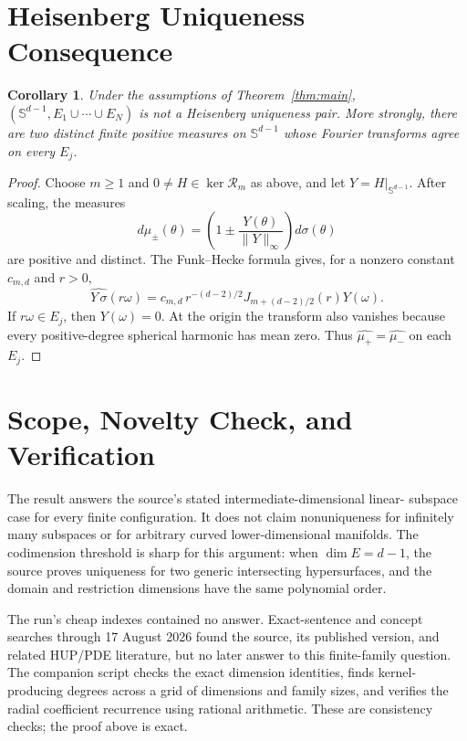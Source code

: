 \documentclass[11pt]{article}
\newtheorem{corollary}{Corollary}
\newcommand{\sphere}{\mathbb S}
\begin{document}
\section*{Heisenberg Uniqueness Consequence}

\begin{corollary}\label{cor:hup}
Under the assumptions of Theorem~\ref{thm:main},
$(\sphere^{d-1},E_1\cup\cdots\cup E_N)$ is not a Heisenberg uniqueness
pair.  More strongly, there are two distinct finite positive measures on
$\sphere^{d-1}$ whose Fourier transforms agree on every $E_j$.
\end{corollary}

\begin{proof}
Choose $m\geq1$ and $0\neq H\in\ker\mathcal R_m$ as above, and let
$Y=H|_{\sphere^{d-1}}$.  After scaling, the measures
\[
 d\mu_\pm(\theta)=
 \left(1\pm\frac{Y(\theta)}{\|Y\|_\infty}\right)d\sigma(\theta)
\]
are positive and distinct.  The Funk--Hecke formula gives, for a nonzero
constant $c_{m,d}$ and $r>0$,
\[
 \widehat{Y\,\sigma}(r\omega)
 =c_{m,d}\,r^{-(d-2)/2}J_{m+(d-2)/2}(r)Y(\omega).
\]
If $r\omega\in E_j$, then $Y(\omega)=0$.  At the origin the transform also
vanishes because every positive-degree spherical harmonic has mean zero.
Thus $\widehat{\mu_+}=\widehat{\mu_-}$ on each $E_j$.
\end{proof}

\section*{Scope, Novelty Check, and Verification}

The result answers the source's stated intermediate-dimensional linear-
subspace case for every finite configuration.  It does not claim
nonuniqueness for infinitely many subspaces or for arbitrary curved
lower-dimensional manifolds.  The codimension threshold is sharp for this
argument: when $\dim E=d-1$, the source proves uniqueness for two generic
intersecting hypersurfaces, and the domain and restriction dimensions have
the same polynomial order.

The run's cheap indexes contained no answer.  Exact-sentence and concept
searches through 17 August 2026 found the source, its published version,
and related HUP/PDE literature, but no later answer to this finite-family
question.  The companion script checks the exact dimension identities,
finds kernel-producing degrees across a grid of dimensions and family
sizes, and verifies the radial coefficient recurrence using rational
arithmetic.  These are consistency checks; the proof above is exact.
\end{document}
